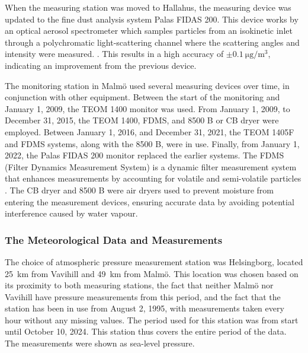 When the measuring station was moved to Hallahus, the measuring device was updated to the fine dust analysis system Palas FIDAS 200. This device works by an optical aerosol spectrometer which samples particles from an isokinetic inlet through a polychromatic light-scattering channel where the scattering angles and intensity were measured. \cite{palasgmbhOperatingManualFidas}. This results in a high accuracy of $\pm\SI{0.1}{\micro\gram\per\meter\cubed}$, indicating an improvement from the previous device. 

The monitoring station in Malmö used several measuring devices over time, in conjunction with other equipment. Between the start of the monitoring and January 1, 2009, the TEOM 1400 monitor was used. From January 1, 2009, to December 31, 2015, the TEOM 1400, FDMS, and 8500 B or CB dryer were employed. Between January 1, 2016, and December 31, 2021, the TEOM 1405F and FDMS systems, along with the 8500 B, were in use. Finally, from January 1, 2022, the Palas FIDAS 200 monitor replaced the earlier systems. The FDMS (Filter Dynamics Measurement System) is a dynamic filter measurement system that enhances measurements by accounting for volatile and semi-volatile particles \cite{thermoscientific8500FDMSFilter2010}. The CB dryer and 8500 B were air dryers used to prevent moisture from entering the measurement devices, ensuring accurate data by avoiding potential interference caused by water vapour.

\subsubsection{The Meteorological Data and Measurements}
The choice of atmospheric pressure measurement station was Helsingborg, located \SI{25}{\km} from Vavihill and \SI{49}{\km} from Malmö. This location was chosen based on its proximity to both \PM measuring stations, the fact that neither Malmö nor Vavihill have pressure measurements from this period, and the fact that the station has been in use from August 2, 1995, with measurements taken every hour without any missing values. The period used for this station was from start until October 10, 2024. This station thus covers the entire period of the \PM data. The measurements were shown as sea-level pressure.

